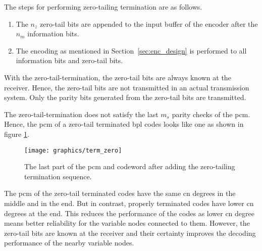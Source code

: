 The steps for performing zero-tailing termination are as follows.
\begin{enumerate}
  \item The $n_z$ zero-tail bits are appended to the input buffer of the encoder after the $n_m$ information bits.
  \item The encoding as mentioned in Section~\ref{sec:enc_design} is performed to all information bits and zero-tail bits.
\end{enumerate}
With the zero-tail-termination, the zero-tail bits are always known at the receiver. Hence, the zero-tail bits are not transmitted in an actual transmission system. Only the parity bits generated from the zero-tail bits are transmitted.

The zero-tail-termination does not satisfy the last $m_s$ parity checks of the \ac{pcm}. Hence, the \ac{pcm} of a zero-tail terminated \ac{bpl} codes looks like one as shown in figure \ref{fig:pcm_zero}.
\begin{figure}[htbp]
  \centering
  \texttt{[image: graphics/term\_zero]}
  \caption{The last part of the \ac{pcm} and codeword after adding the zero-tailing termination sequence.}
  \label{fig:pcm_zero}
\end{figure}

The \ac{pcm} of the zero-tail terminated codes have the same \ac{cn} degrees in the middle and in the end. But in contrast, properly terminated codes have lower \ac{cn} degrees at the end. This reduces the performance of the codes as lower \ac{cn} degree means better reliability for the variable nodes connected to them. However, the zero-tail bits are known at the receiver and their certainty improves the decoding performance of the nearby variable nodes.